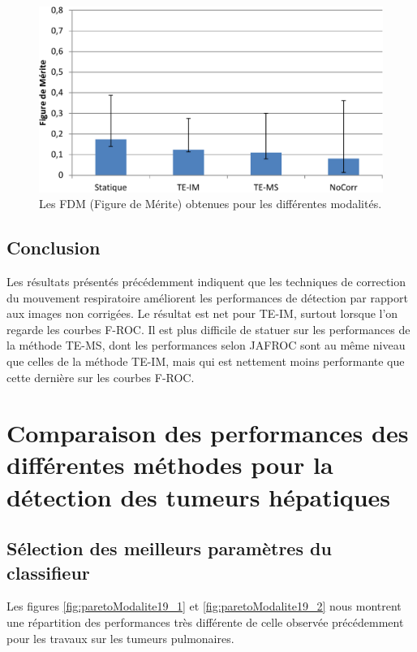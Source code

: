 \begin{figure}[h!]
 \begin{center}
   \includegraphics[width=13cm]{images/FOM_mod}
 \end{center}
 \caption{Les FDM (Figure de Mérite) obtenues pour les différentes modalités.}
 \label{fig:fom_mod}
\end{figure}

\subsection{Conclusion}

Les résultats présentés précédemment indiquent que les techniques de correction du mouvement respiratoire améliorent les performances de détection par rapport aux images non corrigées. Le résultat est net pour TE-IM, surtout lorsque l'on regarde les courbes F-ROC. Il est plus difficile de statuer sur les performances de la méthode TE-MS, dont les performances selon JAFROC sont au même niveau que celles de la méthode TE-IM, mais qui est nettement moins performante que cette dernière sur les courbes F-ROC.


\FloatBarrier

\section{Comparaison des performances des différentes méthodes pour la détection des tumeurs hépatiques}


\subsection{Sélection des meilleurs paramètres du classifieur}

Les figures \ref{fig:paretoModalite19_1} et \ref{fig:paretoModalite19_2} nous montrent une répartition des performances très différente de celle observée précédemment pour les travaux sur les tumeurs pulmonaires. 


